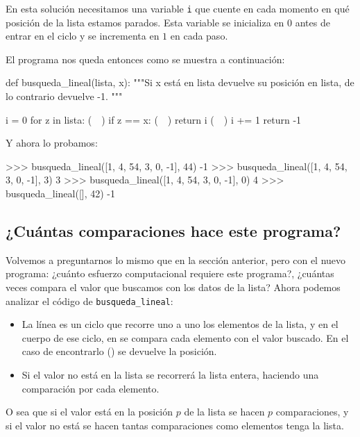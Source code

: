 En esta solución necesitamos una variable \lstinline!i! que cuente en cada
momento en qué posición de la lista estamos parados. Esta variable se
inicializa en $0$ antes de entrar en el ciclo y se incrementa en $1$ en
cada paso.

El programa nos queda entonces como se muestra a continuación:

\begin{codigo-python-sn}
def busqueda_lineal(lista, x):
    """Si x está en lista devuelve su posición en lista, de lo
    contrario devuelve -1.
    """

    i = 0
    for z in lista: (~~)
        if z == x: (~~)
            return i (~~)
        i += 1
    return -1
\end{codigo-python-sn}

Y ahora lo probamos:

\begin{codigo-python-sn}
>>> busqueda_lineal([1, 4, 54, 3, 0, -1], 44)
-1
>>> busqueda_lineal([1, 4, 54, 3, 0, -1], 3)
3
>>> busqueda_lineal([1, 4, 54, 3, 0, -1], 0)
4
>>> busqueda_lineal([], 42)
-1
\end{codigo-python-sn}

\subsection*{¿Cuántas comparaciones hace este programa?}
\label{busqueda-lineal}

Volvemos a preguntarnos lo mismo que en la sección anterior, pero con el nuevo
programa: ¿cuánto esfuerzo computacional requiere este programa?, ¿cuántas
veces compara el valor que buscamos con los datos de la lista? Ahora podemos
analizar el código de \lstinline!busqueda_lineal!:

\begin{itemize}
\item La línea  es un ciclo que recorre uno a uno los
elementos de la lista, y en el cuerpo de ese ciclo, en  se
compara cada elemento con el valor buscado. En el caso de encontrarlo
() se devuelve la posición.

\item Si el valor no está en la lista se recorrerá la lista entera, haciendo
una comparación por cada elemento.
\end{itemize}

O sea que si el valor está en la posición $p$ de la lista se hacen $p$
comparaciones, y si el valor no está se hacen tantas comparaciones como
elementos tenga la lista.

